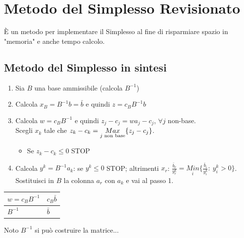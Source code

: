 \section{Metodo del Simplesso Revisionato}
È un metodo per implementare il Simplesso al fine di risparmiare spazio in "memoria" e anche tempo calcolo.

\subsection{Metodo del Simplesso in sintesi}
\begin{enumerate}
	\item Sia $B$ una base ammissibile (calcola $B^{-1}$)
	\item Calcola $x_{B}=B^{-1}b=\bar{b}$ e quindi $z=c_{B}B^{-1}b$
	\item Calcola $w=c_{B}B^{-1}$ e quindi $z_{j}-c_{j}=w a_{j}-c_{j}$, $\forall j$ non-base.\\
	Scegli $x_{k}$ tale che $z_{k}-c_{k}=\underset{j \textnormal{ non base}}{Max}\{z_{j}-c_{j}\}$.
	\begin{itemize}
		\item Se $z_{k}-c_{k}\le 0$ STOP
	\end{itemize}
	\item Calcola $y^{k}=B^{-1}a_{k}$: se $y^{k}\le 0$ STOP; altrimenti
	$x_{r}$: $\frac{\bar{b}_{r}}{y^{k}_{r}}=\underset{i}{Min}\{\frac{\bar{b}_{i}}{y_{i}^{k}}:\ y_{i}^{k}>0\}$.\\
	Sostituisci in $B$ la colonna $a_{r}$ con $a_{k}$ e vai al passo 1.
\end{enumerate}
\begin{table}
	\begin{tabular}{|l|l|}
		\hline
		$w=c_{B}B^{-1}$ & $c_{B}\bar{b}$ \\ \hline
		$B^{-1}$ & $\bar{b}$ \\ \hline 
	\end{tabular}
\end{table}

Noto $B^{-1}$ si può costruire la matrice...\\


